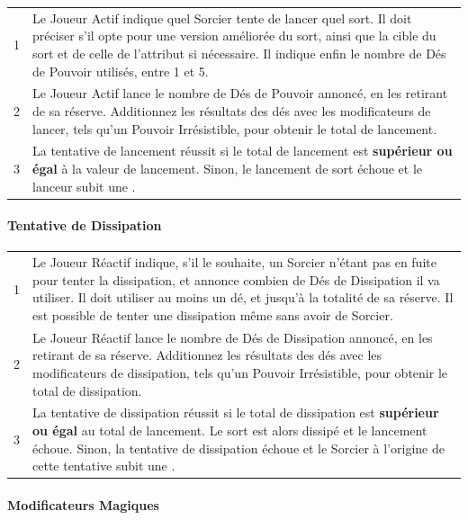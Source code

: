 {\begin{multicols}{2}
\begin{tabular}{c|m{7.4cm}}
1 & Le Joueur Actif indique quel Sorcier tente de lancer quel sort. Il doit préciser s'il opte pour une version améliorée du sort, ainsi que la cible du sort et de celle de l'attribut si nécessaire. Il indique enfin le nombre de Dés de Pouvoir utilisés, entre 1 et 5. \tabularnewline
2 & Le Joueur Actif lance le nombre de Dés de Pouvoir annoncé, en les retirant de sa réserve. Additionnez les résultats des dés avec les modificateurs de lancer, tels qu'un Pouvoir Irrésistible, pour obtenir le total de lancement. \tabularnewline
3 & La tentative de lancement réussit si le total de lancement est \textbf{supérieur ou égal} à la valeur de lancement. Sinon, le lancement de sort échoue et le lanceur subit une \lostfocus{}. \tabularnewline
\end{tabular}

\vspace*{10pt}
\paragraph{Tentative de Dissipation}

\begin{tabular}{c|m{7.4cm}}
1 & Le Joueur Réactif indique, s'il le souhaite, un Sorcier n'étant pas en fuite pour tenter la dissipation, et annonce combien de Dés de Dissipation il va utiliser. Il doit utiliser au moins un dé, et jusqu'à la totalité de sa réserve. Il est possible de tenter une dissipation même sans avoir de Sorcier. \tabularnewline
2 & Le Joueur Réactif lance le nombre de Dés de Dissipation annoncé, en les retirant de sa réserve. Additionnez les résultats des dés avec les modificateurs de dissipation, tels qu'un Pouvoir Irrésistible, pour obtenir le total de dissipation. \tabularnewline
3 & La tentative de dissipation réussit si le total de dissipation est \textbf{supérieur ou égal} au total de lancement. Le sort est alors dissipé et le lancement échoue. Sinon, la tentative de dissipation échoue et le Sorcier à l'origine de cette tentative subit une \lostfocus{}. \tabularnewline
\end{tabular}

\vspace*{20pt}
\begin{framed}
\vspace*{-17pt}
\paragraph{Modificateurs Magiques}


\end{framed}
\end{multicols}}
